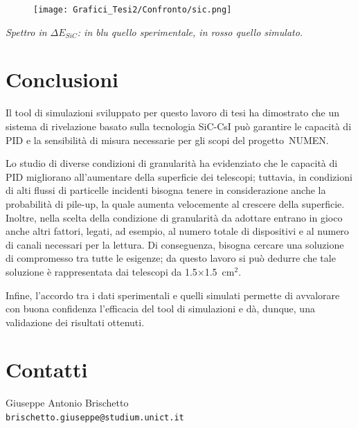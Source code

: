 \documentclass[10pt,foldmark,notumble]{leaflet}
\begin{document}
\begin{figure} [!h]
	\centering
	\texttt{[image: Grafici\_Tesi2/Confronto/sic.png]}
\end{figure}
\textit{Spettro in $\Delta E_{SiC}$: in blu quello sperimentale, in rosso quello simulato.}


\section{Conclusioni}


Il tool di simulazioni sviluppato per questo lavoro di tesi ha dimostrato che un sistema di rivelazione basato sulla tecnologia SiC-CsI può garantire le capacità di PID e la sensibilità di misura necessarie per gli scopi del progetto~NUMEN.

Lo studio di diverse condizioni di granularità ha evidenziato che le capacità di PID migliorano all'aumentare della superficie dei telescopi; tuttavia, in condizioni di alti flussi di particelle incidenti bisogna tenere in considerazione anche la probabilità di pile-up, la quale aumenta velocemente al crescere della superficie.
Inoltre, nella scelta della condizione di granularità da adottare entrano in gioco anche altri fattori, legati, ad esempio, al numero totale di dispositivi e al numero di canali necessari per la lettura.
Di conseguenza, bisogna cercare una soluzione di compromesso tra tutte le esigenze; da questo lavoro si può dedurre che tale soluzione è rappresentata dai telescopi da 1.5$\times$1.5~$\mbox{cm}^2$.

Infine, l'accordo tra i dati sperimentali e quelli simulati permette di avvalorare con buona confidenza l'efficacia del tool di simulazioni e dà, dunque, una validazione dei risultati ottenuti.













\section{Contatti}

Giuseppe Antonio Brischetto\\ {\tt brischetto.giuseppe@studium.unict.it}
\end{document}
